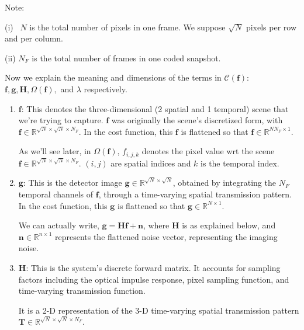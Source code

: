 \documentclass[fleqn, 11pt]{article}
\begin{document}
\medskip 

Note: 

(i) \ $N$ is the total number of pixels in one frame. We suppose $\sqrt{N}$ pixels per row and per column.

(ii) $N_F$ is the total number of frames in one coded snapshot.

\medskip

Now we explain the meaning and dimensions of the terms in $\mathcal{C}(\mathbf{f})$:
$\mathbf{f}, \mathbf{g}, \mathbf{H},
\Omega(\mathbf{f}),$ and $ \lambda$ respectively.

\medskip


\begin{enumerate}


\item $\mathbf{f}$: This denotes the three-dimensional (2 spatial and 1 temporal) scene that we're trying to capture. $\mathbf{f}$ was originally 
the scene's discretized form, with $\mathbf{f} \in \mathbb{R}^{\sqrt{N} \times \sqrt{N} \times N_F }$. In the 
cost function, this $\mathbf{f}$ is flattened so that $\mathbf{f} \in \mathbb{R}^{N N_F \times 1}$. 

As we'll see later, in $\Omega(\mathbf{f})$, $f_{i,j,k}$ denotes the pixel value wrt the scene 
$\mathbf{f} \in \mathbb{R}^{\sqrt{N} \times \sqrt{N} \times N_F }$. 
$(i,j)$ are spatial indices and $k$ is the temporal index. 

\medskip

\item $\mathbf{g}$: This is the detector image $\mathbf{g} \in \mathbb{R}^{\sqrt{N} \times \sqrt{N}}$, obtained by 
integrating the $N_F$ temporal channels of $\mathbf{f}$, through a time-varying spatial transmission pattern. 
In the cost function, this $\mathbf{g}$ is flattened so that $\mathbf{g} \in \mathbb{R}^{N \times 1}$. 

We can actually write,  $\mathbf{g= Hf +n}$, where $\mathbf{H}$ is as explained below, and 
$\mathbf{n} \in \mathbb{R}^{n \times 1}$ represents
the flattened noise vector, 
representing the imaging noise.

\medskip

\item $\mathbf{H}$: This is the system's discrete forward matrix. It accounts for sampling factors
including the optical impulse response, pixel sampling function, and time-varying transmission
function.

\medskip

It is a 2-D representation of the 
3-D time-varying spatial transmission pattern $\mathbf{T} \in  \mathbb{R}^{\sqrt{N} \times \sqrt{N} \times N_F }$.


\end{enumerate}
\end{document}
